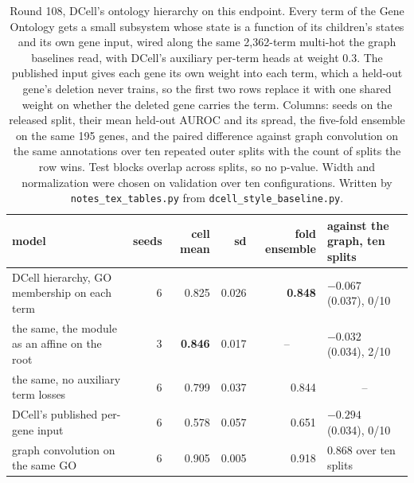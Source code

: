 \begin{table}[H]
  \centering
  \footnotesize
  \caption[Round 108: DCell over these splits]{Round 108, DCell's ontology hierarchy on this endpoint. Every term of the Gene Ontology gets a small subsystem whose state is a function of its children's states and its own gene input, wired along the same 2,362-term multi-hot the graph baselines read, with DCell's auxiliary per-term heads at weight 0.3. The published input gives each gene its own weight into each term, which a held-out gene's deletion never trains, so the first two rows replace it with one shared weight on whether the deleted gene carries the term. Columns: seeds on the released split, their mean held-out AUROC and its spread, the five-fold ensemble on the same 195 genes, and the paired difference against graph convolution on the same annotations over ten repeated outer splits with the count of splits the row wins. Test blocks overlap across splits, so no p-value. Width and normalization were chosen on validation over ten configurations. Written by \texttt{notes\_tex\_tables.py} from \texttt{dcell\_style\_baseline.py}.}
  \label{tab:dcell-style}
  \begin{tabular}{@{}lrrrrl@{}}
    \hline
    model & seeds & cell mean & sd & fold ensemble & against the graph, ten splits \\
    \hline
    DCell hierarchy, GO membership on each term & 6 & 0.825 & 0.026 & \textbf{0.848} & $-0.067$ (0.037), 0/10 \\
    the same, the module as an affine on the root & 3 & \textbf{0.846} & 0.017 & \multicolumn{1}{c}{--} & $-0.032$ (0.034), 2/10 \\
    the same, no auxiliary term losses & 6 & 0.799 & 0.037 & 0.844 & \multicolumn{1}{c}{--} \\
    DCell's published per-gene input & 6 & 0.578 & 0.057 & 0.651 & $-0.294$ (0.034), 0/10 \\
    \hline
    graph convolution on the same GO & 6 & 0.905 & 0.005 & 0.918 & 0.868 over ten splits \\
    \hline
  \end{tabular}
\end{table}
